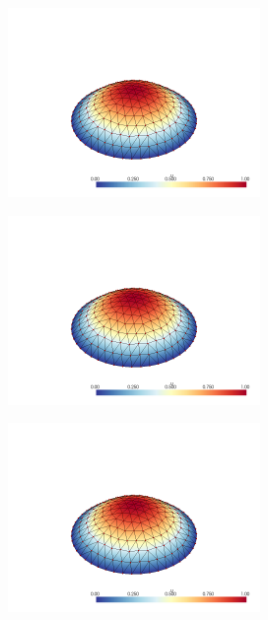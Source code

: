 \documentclass[
  11pt,
]{article}
\let\origfigure\figure
\let\endorigfigure\endfigure
\renewenvironment{figure}[1][2] {
    \expandafter\origfigure\expandafter[H]
} {
    \endorigfigure
}
\begin{document}
\begin{figure}
\centering
\includegraphics[width=0.5\textwidth,height=\textheight]{../img/mesh2-gauss08-b.png}
\caption{Finite element solution for problem 1 over mesh number 2 and
order-8 numerical integration.}
\end{figure}

\begin{figure}
\centering
\includegraphics[width=0.5\textwidth,height=\textheight]{../img/mesh2-gauss13-b.png}
\caption{Finite element solution for problem 1 over mesh number 2 and
order-13 numerical integration.}
\end{figure}

\begin{figure}
\centering
\includegraphics[width=0.5\textwidth,height=\textheight]{../img/mesh2-gauss19-b.png}
\caption{Finite element solution for problem 1 over mesh number 2 and
order-19 numerical integration.}
\end{figure}
\end{document}
